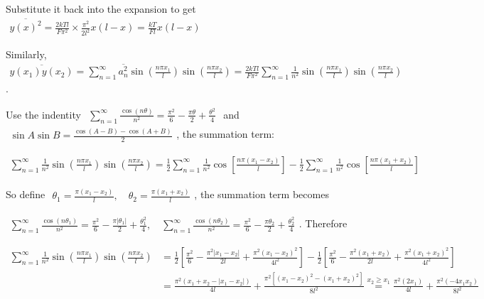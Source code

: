 \documentclass[../../main.tex]{subfiles}
\begin{document}
  Substitute it back into the expansion to get $\begin{aligned}
    \overline{y(x)^{2}} = \frac{2kTl}{F\pi^{2}}\times \frac{\pi^{2}}{2l^{2}}x(l-x) = \boxed{\frac{kT}{Fl}x(l-x)}
  \end{aligned}$

  Similarly, $\begin{aligned}
    \overline{y(x_{1})y(x_{2})} = \sum_{n=1}^{\infty}\overline{a_{n}^{2}}\sin{\left(\frac{n\pi x_{1}}{l}\right)}\sin{\left(\frac{n\pi x_{2}}{l}\right)} = \frac{2kTl}{F\pi^{2}}\sum_{n=1}^{\infty}\frac{1}{n^{2}}\sin{\left(\frac{n\pi x_{1}}{l}\right)}\sin{\left(\frac{n\pi x_{2}}{l}\right)}
  \end{aligned}$.

  Use the indentity $\begin{aligned}
    \sum_{n=1}^{\infty}\frac{\cos{(n\theta)}}{n^{2}} = \frac{\pi^{2}}{6} - \frac{\pi\theta}{2} + \frac{\theta^{2}}{4}
  \end{aligned}$ and $\begin{aligned}
    \sin{A}\sin{B} = \frac{\cos{(A-B)}-\cos{(A+B)}}{2}
  \end{aligned}$, the summation term:

  $\begin{aligned}
    \sum_{n=1}^{\infty}\frac{1}{n^{2}}\sin{\left(\frac{n\pi x_{1}}{l}\right)}\sin{\left(\frac{n\pi x_{2}}{l}\right)} = \frac{1}{2}\sum_{n=1}^{\infty}\frac{1}{n^{2}}\cos{\left[\frac{n\pi(x_{1}-x_{2})}{l}\right]} - \frac{1}{2}\sum_{n=1}^{\infty}\frac{1}{n^{2}}\cos{\left[\frac{n\pi(x_{1}+x_{2})}{l}\right]}
  \end{aligned}$

  So define $\begin{aligned}
    \theta_{1} = \frac{\pi(x_{1}-x_{2})}{l},\quad\theta_{2} = \frac{\pi(x_{1}+x_{2})}{l}
  \end{aligned}$, the summation term becomes 
  
  $\begin{aligned}
    \sum_{n=1}^{\infty}\frac{\cos{(n\theta_{1})}}{n^{2}} = \frac{\pi^{2}}{6} - \frac{\pi|\theta_{1}|}{2} + \frac{\theta_{1}^{2}}{4},\quad \sum_{n=1}^{\infty}\frac{\cos{(n\theta_{2})}}{n^{2}} = \frac{\pi^{2}}{6} - \frac{\pi\theta_{2}}{2} + \frac{\theta_{2}^{2}}{4}
  \end{aligned}$. Therefore

  $\begin{aligned}
    \sum_{n=1}^{\infty}\frac{1}{n^{2}}\sin{\left(\frac{n\pi x_{1}}{l}\right)}\sin{\left(\frac{n\pi x_{2}}{l}\right)} &= \frac{1}{2}\left[
    \frac{\pi^{{2}}}{6} - \frac{\pi^{2}|x_{1}-x_{2}|}{2l} + \frac{\pi^{2}(x_{1}-x_{2})^{2}}{4l^{2}}
    \right] - \frac{1}{2}\left[
    \frac{\pi^{{2}}}{6} - \frac{\pi^{2}(x_{1}+x_{2})}{2l} + \frac{\pi^{2}(x_{1}+x_{2})^{2}}{4l^{2}}
    \right]\\
  &= \frac{\pi^{2}(x_{1}+x_{2}-|x_{1}-x_{2}|)}{4l} + \frac{\pi^{2}[(x_{1}-x_{2})^{2}-(x_{1}+x_{2})^{2}]}{8l^{2}} \stackrel{x_{2}\geq x_{1}}{=} \frac{\pi^{2} (2x_{1})}{4l} + \frac{\pi^{2}(-4x_{1}x_{2})}{8l^{2}}
  \end{aligned}$
\end{document}
